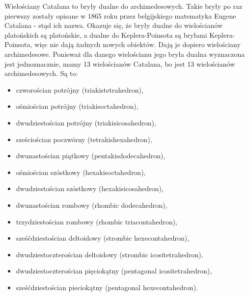 %

Wielościany Catalana to bryły dualne do archimedesowych. Takie bryły po raz pierwszy zostały opisane w 1865 roku przez belgijskiego matematyka Eugene Catalana - stąd ich nazwa.
Okazuje się, że bryły dualne do wielościanów platońskich są platońskie, a dualne do Keplera-Poinsota są bryłami Keplera-Poinsota, więc nie dają żadnych nowych obiektów. Dają je dopiero wielościany archimedesowe.
Ponieważ dla danego wielościanu jego bryła dualna wyznaczona jest jednoznacznie, mamy 13 wielościanów Catalana, bo jest 13 wielościanów archimedesowych. Są to:
 
\begin{itemize}
\item czworościan potrójny (triakistetrahedron),
\item ośmiościan potrójny (triakisoctahedron),
\item dwudziestościan potrójny (triakisicosahedron),
\item sześciościan poczwórny (tetrakishexahedron),
\item dwunastościan piątkowy (pentakisdodecahedron),
\item ośmiościan szóstkowy (hexakisoctahedron),
\item dwudziestościan szóstkowy (hexakisicosahedron),
\item dwunastościan rombowy (rhombic dodecahedron),
\item trzydziestościan rombowy (rhombic triacontahedron),
\item sześćdziestościan deltoidowy (strombic hexecontahedron),
\item dwudziestoczterościan deltoidowy (strombic icositetrahedron),
\item dwudziestoczterościan pięciokątny (pentagonal icositetrahedron),
\item sześćdziestościan pieciokątny (pentagonal hexecontahedron).
\end{itemize}

%